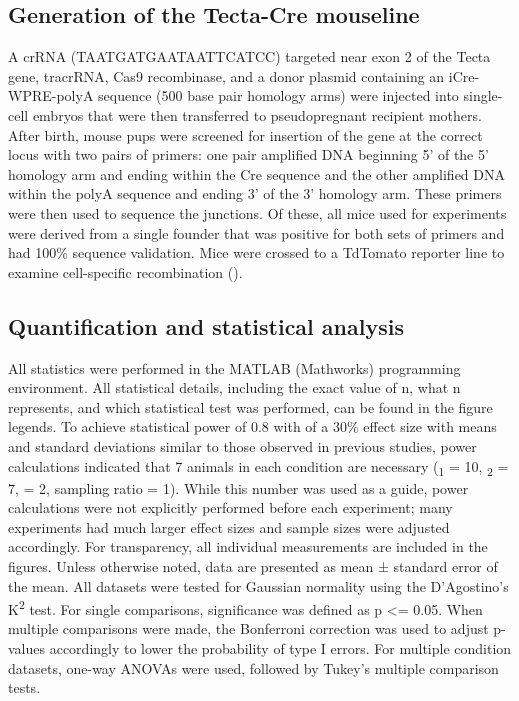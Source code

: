 \documentclass[9pt,lineno]{elife}
\begin{document}
\subsection{Generation of the Tecta-Cre mouseline}
A crRNA (TAATGATGAATAATTCATCC) targeted near exon 2 of the Tecta gene, tracrRNA, Cas9 recombinase, and a donor plasmid containing an iCre-WPRE-polyA sequence (500 base pair homology arms) were injected into single-cell embryos that were then transferred to pseudopregnant recipient mothers. After birth, mouse pups were screened for insertion of the gene at the correct locus with two pairs of primers: one pair amplified DNA beginning 5’ of the 5’ homology arm and ending within the Cre sequence and the other amplified DNA within the polyA sequence and ending 3’ of the 3’ homology arm. These primers were then used to sequence the junctions. Of these, all mice used for experiments were derived from a single founder that was positive for both sets of primers and had 100\% sequence validation. Mice were crossed to a TdTomato reporter line to examine cell-specific recombination ().

\subsection{Quantification and statistical analysis}
All statistics were performed in the MATLAB (Mathworks) programming environment. All statistical details, including the exact value of n, what n represents, and which statistical test was performed, can be found in the figure legends. To achieve statistical power of 0.8 with of a 30\% effect size with means and standard deviations similar to those observed in previous studies, power calculations indicated that 7 animals in each condition are necessary (\textmu \textsubscript{1} = 10, \textmu \textsubscript{2} = 7, \textsigma = 2, sampling ratio = 1). While this number was used as a guide, power calculations were not explicitly performed before each experiment; many experiments had much larger effect sizes and sample sizes were adjusted accordingly. For transparency, all individual measurements are included in the figures. Unless otherwise noted, data are presented as mean ± standard error of the mean. All datasets were tested for Gaussian normality using the D’Agostino’s K\textsuperscript{2} test. For single comparisons, significance was defined as p <= 0.05. When multiple comparisons were made, the Bonferroni correction was used to adjust p-values accordingly to lower the probability of type I errors. For multiple condition datasets, one-way ANOVAs were used, followed by Tukey’s multiple comparison tests.
\end{document}
